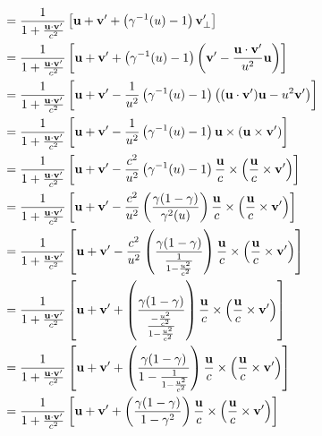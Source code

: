 \documentclass[12pt,a4]{article}
\begin{document}
\begin{enumerate}
\begin{enumerate}
\begin{align*}
                  &= \frac{1}{1 + \frac{{\bf u} \cdot {\bf v}'}{c^2}} \left[ {\bf u} + {\bf v'} + \left(\gamma^{-1}(  u) - 1\right) {\bf v}'_\perp\right]\\
                  &= \frac{1}{1 + \frac{{\bf u} \cdot {\bf v}'}{c^2}} \left[ {\bf u} + {\bf v'} + \left(\gamma^{-1}(  u) - 1\right) \left({\bf v}' - \frac{{\bf u}\cdot{\bf v}'}{u^2} {\bf u}\right)\right]\\
                  &= \frac{1}{1 + \frac{{\bf u} \cdot {\bf v}'}{c^2}} \left[ {\bf u} + {\bf v'} - \frac{1}{u^2}\left(\gamma^{-1}(  u) - 1\right) \left(({\bf u}\cdot{\bf v}'){\bf u} - u^2{\bf v}'\right)\right]\\
                  &= \frac{1}{1 + \frac{{\bf u} \cdot {\bf v}'}{c^2}} \left[ {\bf u} + {\bf v'} - \frac{1}{u^2}\left(\gamma^{-1}(  u) - 1\right) {\bf u} \times \left({\bf u} \times {\bf v}'\right)\right]\\
                  &= \frac{1}{1 + \frac{{\bf u} \cdot {\bf v}'}{c^2}} \left[ {\bf u} + {\bf v'} - \frac{c^2}{u^2}\left(\gamma^{-1}(  u) - 1\right) \frac{\bf u}{c} \times \left(\frac{\bf u}{c} \times {\bf v}'\right)\right]\\
                  &= \frac{1}{1 + \frac{{\bf u} \cdot {\bf v}'}{c^2}} \left[ {\bf u} + {\bf v'} - \frac{c^2}{u^2}\left(\frac{\gamma (1 - \gamma)}{\gamma^{2}( u)} \right) \frac{\bf u}{c} \times \left(\frac{\bf u}{c} \times {\bf v}'\right)\right]\\
                  &= \frac{1}{1 + \frac{{\bf u} \cdot {\bf v}'}{c^2}} \left[ {\bf u} + {\bf v'} - \frac{c^2}{u^2}\left(\frac{\gamma (1 - \gamma)}{\frac{1}{1 - \frac{u^2}{c^2}}} \right) \frac{\bf u}{c} \times \left(\frac{\bf u}{c} \times {\bf v}'\right)\right]\\
                  &= \frac{1}{1 + \frac{{\bf u} \cdot {\bf v}'}{c^2}} \left[ {\bf u} + {\bf v'} + \left(\frac{\gamma (1 - \gamma)}{\frac{-\frac{u^2}{c^2}}{1 - \frac{u^2}{c^2}}} \right) \frac{\bf u}{c} \times \left(\frac{\bf u}{c} \times {\bf v}'\right)\right]\\
                  &= \frac{1}{1 + \frac{{\bf u} \cdot {\bf v}'}{c^2}} \left[ {\bf u} + {\bf v'} + \left(\frac{\gamma (1 - \gamma)}{ 1 - \frac{1}{1 - \frac{u^2}{c^2}}} \right) \frac{\bf u}{c} \times \left(\frac{\bf u}{c} \times {\bf v}'\right)\right]\\
                  &= \frac{1}{1 + \frac{{\bf u} \cdot {\bf v}'}{c^2}} \left[ {\bf u} + {\bf v'} + \left(\frac{\gamma (1 - \gamma)}{ 1 - \gamma^2} \right) \frac{\bf u}{c} \times \left(\frac{\bf u}{c} \times {\bf v}'\right)\right]\\

\end{align*}
\end{enumerate}
\end{enumerate}
\end{document}

